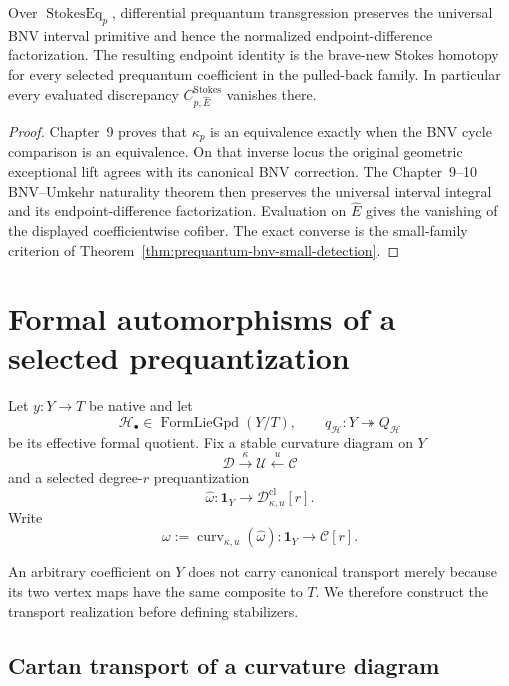 \begin{theorem}
\label{thm:prequantum-bnv-stokes-compatibility}
Over $\operatorname{StokesEq}_{p}$, differential prequantum transgression preserves
the universal BNV interval primitive and hence the normalized endpoint-difference
factorization.  The resulting endpoint identity is the brave-new Stokes homotopy
for every selected prequantum coefficient in the pulled-back family.  In
particular every evaluated discrepancy $C^{\mathrm{Stokes}}_{p,\widehat E}$
vanishes there.
\end{theorem}

\begin{proof}
Chapter~9 proves that $\kappa_p$ is an equivalence exactly when the BNV cycle
comparison is an equivalence.  On that inverse locus the original geometric
exceptional lift agrees with its canonical BNV correction.  The Chapter~9--10
BNV--Umkehr naturality theorem then preserves the universal interval integral and
its endpoint-difference factorization.  Evaluation on $\widehat E$ gives the
vanishing of the displayed coefficientwise cofiber.  The exact converse is the
small-family criterion of
Theorem~\ref{thm:prequantum-bnv-small-detection}.
\end{proof}

\section{Formal automorphisms of a selected prequantization}
\label{sec:prequantum-formal-automorphisms}

Let $y:Y\to T$ be native and let
\[
\mathcal H_\bullet\in\operatorname{FormLieGpd}(Y/T),
\qquad
q_{\mathcal H}:Y\twoheadrightarrow Q_{\mathcal H}
\]
be its effective formal quotient.  Fix a stable curvature diagram on $Y$
\[
\mathscr D\xrightarrow{\kappa}\mathscr U\xleftarrow{u}\mathscr C
\]
and a selected degree-$r$ prequantization
\[
\widehat\omega:
\mathbf1_Y\longrightarrow
\mathscr D^{\mathrm{cl}}_{\kappa,u}[r].
\]
Write
\[
\omega:=\operatorname{curv}_{\kappa,u}(\widehat\omega):
\mathbf1_Y\longrightarrow\mathscr C[r].
\]

An arbitrary coefficient on $Y$ does not carry canonical transport merely because
its two vertex maps have the same composite to $T$.  We therefore construct the
transport realization before defining stabilizers.

\subsection{Cartan transport of a curvature diagram}
\label{subsec:prequantum-cartan-transport-curvature-diagram}

